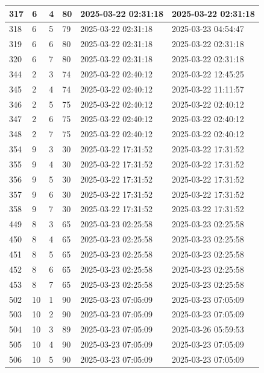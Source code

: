 \begin{longtable}{|l|l|l|l|l|l|}
317 & 6 & 4 & 80 & 2025-03-22 02:31:18 & 2025-03-22 02:31:18 \\ \hline 
318 & 6 & 5 & 79 & 2025-03-22 02:31:18 & 2025-03-23 04:54:47 \\ \hline 
319 & 6 & 6 & 80 & 2025-03-22 02:31:18 & 2025-03-22 02:31:18 \\ \hline 
320 & 6 & 7 & 80 & 2025-03-22 02:31:18 & 2025-03-22 02:31:18 \\ \hline 
344 & 2 & 3 & 74 & 2025-03-22 02:40:12 & 2025-03-22 12:45:25 \\ \hline 
345 & 2 & 4 & 74 & 2025-03-22 02:40:12 & 2025-03-22 11:11:57 \\ \hline 
346 & 2 & 5 & 75 & 2025-03-22 02:40:12 & 2025-03-22 02:40:12 \\ \hline 
347 & 2 & 6 & 75 & 2025-03-22 02:40:12 & 2025-03-22 02:40:12 \\ \hline 
348 & 2 & 7 & 75 & 2025-03-22 02:40:12 & 2025-03-22 02:40:12 \\ \hline 
354 & 9 & 3 & 30 & 2025-03-22 17:31:52 & 2025-03-22 17:31:52 \\ \hline 
355 & 9 & 4 & 30 & 2025-03-22 17:31:52 & 2025-03-22 17:31:52 \\ \hline 
356 & 9 & 5 & 30 & 2025-03-22 17:31:52 & 2025-03-22 17:31:52 \\ \hline 
357 & 9 & 6 & 30 & 2025-03-22 17:31:52 & 2025-03-22 17:31:52 \\ \hline 
358 & 9 & 7 & 30 & 2025-03-22 17:31:52 & 2025-03-22 17:31:52 \\ \hline 
449 & 8 & 3 & 65 & 2025-03-23 02:25:58 & 2025-03-23 02:25:58 \\ \hline 
450 & 8 & 4 & 65 & 2025-03-23 02:25:58 & 2025-03-23 02:25:58 \\ \hline 
451 & 8 & 5 & 65 & 2025-03-23 02:25:58 & 2025-03-23 02:25:58 \\ \hline 
452 & 8 & 6 & 65 & 2025-03-23 02:25:58 & 2025-03-23 02:25:58 \\ \hline 
453 & 8 & 7 & 65 & 2025-03-23 02:25:58 & 2025-03-23 02:25:58 \\ \hline 
502 & 10 & 1 & 90 & 2025-03-23 07:05:09 & 2025-03-23 07:05:09 \\ \hline 
503 & 10 & 2 & 90 & 2025-03-23 07:05:09 & 2025-03-23 07:05:09 \\ \hline 
504 & 10 & 3 & 89 & 2025-03-23 07:05:09 & 2025-03-26 05:59:53 \\ \hline 
505 & 10 & 4 & 90 & 2025-03-23 07:05:09 & 2025-03-23 07:05:09 \\ \hline 
506 & 10 & 5 & 90 & 2025-03-23 07:05:09 & 2025-03-23 07:05:09 \\ \hline 

\end{longtable}
